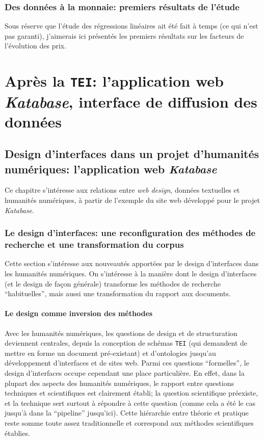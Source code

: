 \documentclass[a4paper, 12pt, twoside]{book}
\newcommand{\ktb}{\textit{Katabase}}
\newcommand{\tei}{\texttt{TEI}}
\begin{document}
\section{Des données à la monnaie: premiers résultats de l'étude}
Sous réserve que l'étude des régressions linéaires ait été fait à temps (ce qui n'est pas garanti), j'aimerais ici présentés les premiers résultats sur les facteurs de l'évolution des prix.


\part{Après la \tei{}: l'application web \ktb{}, interface de diffusion des données}
\chapter{Design d'interfaces dans un projet d'humanités numériques: l'application web \ktb{}}
Ce chapitre s'intéresse aux relations entre \textit{web design}, données textuelles et humanités numériques, à partir de l'exemple du site web développé pour le projet \ktb{}.

\section{Le design d'interfaces: une reconfiguration des méthodes de recherche et une transformation du corpus}
Cette section s'intéresse aux nouveautés apportées par le design d'interfaces dans les humanités numériques. On s'intéresse à la manière dont le design d'interfaces (et le design de façon générale) transforme les méthodes de recherche \enquote{habituelles}, mais aussi une transformation du rapport aux documents.

\subsection{Le design comme inversion des méthodes}
Avec les humanités numériques, les questions de design et de structuration deviennent centrales, depuis la conception de schémas \tei{} (qui demandent de mettre en forme un document pré-existant) et d'ontologies jusqu'au développement d'interfaces et de sites web. Parmi ces questions \enquote{formelles}, le design d'interfaces occupe cependant une place particulière. En effet, dans la plupart des aspects des humanités numériques, le rapport entre questions techniques et scientifiques est clairement établi; la question scientifique préexiste, et la technique sert surtout à répondre à cette question (comme cela a été le cas jusqu'à dans la \enquote{pipeline} jusqu'ici). Cette hiérarchie entre théorie et pratique reste somme toute assez traditionnelle et correspond aux méthodes scientifiques établies. 
\end{document}
